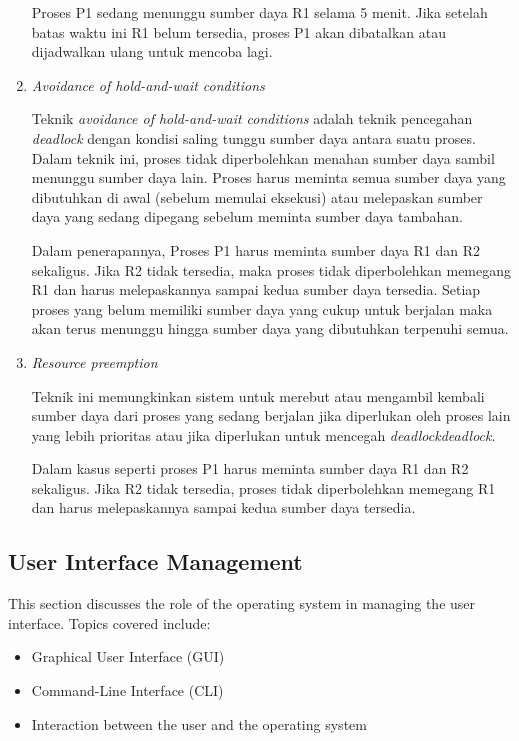 \documentclass[12pt]{article}
\begin{document}
\begin{enumerate}
          \par Proses P1 sedang menunggu sumber daya R1 selama 5 menit. Jika setelah batas
          waktu ini R1 belum tersedia, proses P1 akan dibatalkan atau dijadwalkan ulang
          untuk mencoba lagi.

    \item \textit{Avoidance of hold-and-wait conditions}

          \par Teknik \textit{avoidance of hold-and-wait conditions} adalah teknik pencegahan
          \textit{deadlock} dengan kondisi saling tunggu sumber daya antara suatu proses.
          Dalam teknik ini, proses tidak diperbolehkan menahan sumber daya sambil
          menunggu sumber daya lain. Proses harus meminta semua sumber daya yang
          dibutuhkan di awal (sebelum memulai eksekusi) atau melepaskan sumber daya yang
          sedang dipegang sebelum meminta sumber daya tambahan.

          \par Dalam penerapannya, Proses P1 harus meminta sumber daya R1 dan R2 sekaligus.
          Jika R2 tidak tersedia, maka proses tidak diperbolehkan memegang R1 dan harus
          melepaskannya sampai kedua sumber daya tersedia. Setiap proses yang belum
          memiliki sumber daya yang cukup untuk berjalan maka akan terus menunggu hingga
          sumber daya yang dibutuhkan terpenuhi semua.

    \item \textit{Resource preemption}

          \par Teknik ini memungkinkan sistem untuk merebut atau mengambil kembali sumber daya
          dari proses yang sedang berjalan jika diperlukan oleh proses lain yang lebih
          prioritas atau jika diperlukan untuk mencegah
          \textit{deadlock}\textit{deadlock}.

          \par Dalam kasus seperti proses P1 harus meminta sumber daya R1 dan R2 sekaligus.
          Jika R2 tidak tersedia, proses tidak diperbolehkan memegang R1 dan harus
          melepaskannya sampai kedua sumber daya tersedia.
\end{enumerate}

\subsection{User Interface Management}
This section discusses the role of the operating system in managing the user
interface. Topics covered include:
\begin{itemize}
    \item Graphical User Interface (GUI)
    \item Command-Line Interface (CLI)
    \item Interaction between the user and the operating system
\end{itemize}
\end{document}
